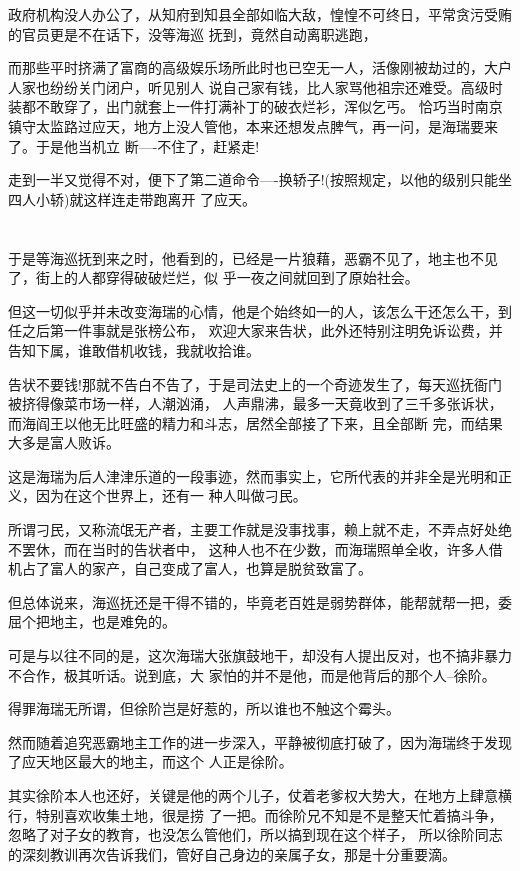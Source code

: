 \documentclass[11pt,a4paper,onecolumn]{article}
\begin{document}
政府机构没人办公了，从知府到知县全部如临大敌，惶惶不可终日，平常贪污受贿的官员更是不在话下，没等海巡
抚到，竟然自动离职逃跑，

而那些平时挤满了富商的高级娱乐场所此时也已空无一人，活像刚被劫过的，大户人家也纷纷关门闭户，听见别人
说自己家有钱，比人家骂他祖宗还难受。高级时装都不敢穿了，出门就套上一件打满补丁的破衣烂衫，浑似乞丐。
恰巧当时南京镇守太监路过应天，地方上没人管他，本来还想发点脾气，再一问，是海瑞要来了。于是他当机立
断----不住了，赶紧走!　

走到一半又觉得不对，便下了第二道命令----换轿子!(按照规定，以他的级别只能坐四人小轿)就这样连走带跑离开
了应天。

\section[\thesection]{}

于是等海巡抚到来之时，他看到的，已经是一片狼藉，恶霸不见了，地主也不见了，街上的人都穿得破破烂烂，似
乎一夜之间就回到了原始社会。

但这一切似乎并未改变海瑞的心情，他是个始终如一的人，该怎么干还怎么干，到任之后第一件事就是张榜公布，
欢迎大家来告状，此外还特别注明免诉讼费，并告知下属，谁敢借机收钱，我就收拾谁。

告状不要钱!那就不告白不告了，于是司法史上的一个奇迹发生了，每天巡抚衙门被挤得像菜市场一样，人潮汹涌，
人声鼎沸，最多一天竟收到了三千多张诉状，而海阎王以他无比旺盛的精力和斗志，居然全部接了下来，且全部断
完，而结果大多是富人败诉。

这是海瑞为后人津津乐道的一段事迹，然而事实上，它所代表的并非全是光明和正义，因为在这个世界上，还有一
种人叫做刁民。

所谓刁民，又称流氓无产者，主要工作就是没事找事，赖上就不走，不弄点好处绝不罢休，而在当时的告状者中，
这种人也不在少数，而海瑞照单全收，许多人借机占了富人的家产，自己变成了富人，也算是脱贫致富了。

但总体说来，海巡抚还是干得不错的，毕竟老百姓是弱势群体，能帮就帮一把，委屈个把地主，也是难免的。

可是与以往不同的是，这次海瑞大张旗鼓地干，却没有人提出反对，也不搞非暴力不合作，极其听话。说到底，大
家怕的并不是他，而是他背后的那个人--徐阶。

得罪海瑞无所谓，但徐阶岂是好惹的，所以谁也不触这个霉头。

然而随着追究恶霸地主工作的进一步深入，平静被彻底打破了，因为海瑞终于发现了应天地区最大的地主，而这个
人正是徐阶。

其实徐阶本人也还好，关键是他的两个儿子，仗着老爹权大势大，在地方上肆意横行，特别喜欢收集土地，很是捞
了一把。而徐阶兄不知是不是整天忙着搞斗争，忽略了对子女的教育，也没怎么管他们，所以搞到现在这个样子，
所以徐阶同志的深刻教训再次告诉我们，管好自己身边的亲属子女，那是十分重要滴。
\end{document}
